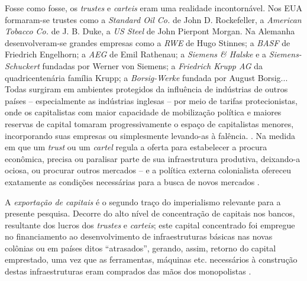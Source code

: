 Fosse como fosse, os \textit{trustes} e \textit{carteis} eram uma realidade incontornável. Nos EUA formaram-se trustes como a \textit{Standard Oil Co.} de John D. Rockefeller, a \textit{American Tobacco Co.} de J. B. Duke, a \textit{US Steel} de John Pierpont Morgan. Na Alemanha desenvolveram-se grandes empresas como a \textit{RWE} de Hugo Stinnes; a \textit{BASF} de Friedrich Engelhorn; a \textit{AEG} de Emil Rathenau; a \textit{Siemens \& Halske} e a \textit{Siemens-Schuckert} fundadas por Werner von Siemens; a \textit{Friedrich Krupp AG} da quadricentenária família Krupp; a \textit{Borsig-Werke} fundada por August Borsig...  Todas surgiram em ambientes protegidos da influência de indústrias de outros países -- especialmente as indústrias inglesas -- por meio de tarifas protecionistas, onde os capitalistas com maior capacidade de mobilização política e maiores reservas de capital tomaram progressivamente o espaço de capitalistas menores, incorporando suas empresas ou simplesmente levando-as à falência.  \cite{bukharin_imperialismo_1986,huberman_historia_1986}.  Na medida em que um \textit{trust} ou um \textit{cartel} regula a oferta para estabelecer a procura econômica, precisa ou paralisar parte de sua infraestrutura produtiva, deixando-a ociosa, ou procurar outros mercados -- e a política externa colonialista ofereceu exatamente as condições necessárias para a busca de novos mercados \cite{lenin_imperialismo_1987}. 

A \textit{exportação de capitais} é o segundo traço do imperialismo relevante para a presente pesquisa. Decorre do alto nível de concentração de capitais nos bancos, resultante dos lucros dos \textit{trustes} e \textit{carteis}; este capital concentrado foi empregue no financiamento ao desenvolvimento de infraestruturas básicas nas novas colônias ou em países ditos ``atrasados'', gerando, assim, retorno do capital emprestado, uma vez que as ferramentas, máquinas etc. necessários à construção destas infraestruturas eram comprados das mãos dos monopolistas \cite{huberman_historia_1986,lenin_imperialismo_1987,luxemburg_acumula_1985}. 

